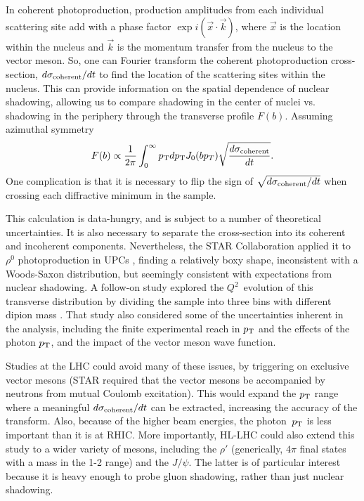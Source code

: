 \documentclass[../report.tex]{subfiles}
\begin{document}

In coherent photoproduction, production amplitudes from each individual scattering site add with a phase factor $\exp{i(\vec{x}\cdot\vec{k})}$, where $\vec{x}$ is the location within the nucleus and $\vec{k}$ is the momentum transfer from the nucleus to the vector meson.  So, one can Fourier transform the coherent photoproduction cross-section, $d\sigma_{\rm coherent}/dt$ to find the location of the scattering sites within the nucleus.  This can provide information on the spatial dependence of nuclear shadowing, allowing us to compare shadowing in the center of nuclei vs. shadowing in the periphery through the transverse profile $F(b)$.   Assuming azimuthal symmetry \cite{Diehl,Toll:2012mb}
\begin{equation}
F(b) \propto \frac{1}{2\pi} \int_0^\infty  p\sb{\scriptstyle\mathrm{T}} dp\sb{\scriptstyle\mathrm{T}} J_0(b p_T) \sqrt{\frac{d\sigma_{\rm coherent}}{dt}}.
\end{equation}
One complication is that it is necessary to flip the sign of $\sqrt{d\sigma_{\rm coherent}/dt}$ when crossing each diffractive minimum in the sample.

This calculation is  data-hungry, and is subject to a number of theoretical uncertainties.  It is also necessary to separate the cross-section into its coherent and incoherent components.  Nevertheless, the STAR Collaboration applied it to $\rho^0$ photoproduction in UPCs \cite{Adamczyk:2017vfu}, finding a relatively boxy shape, inconsistent with a Woods-Saxon distribution, but seemingly consistent with expectations from nuclear shadowing.   A follow-on study explored the  $Q^2$~evolution of this transverse distribution by dividing the sample into three bins with different dipion mass \cite{Klein:2018grn}.  That study also considered some of the uncertainties inherent in the analysis, including the finite experimental reach in $p\sb{\scriptstyle\mathrm{T}}$ and the effects of the photon $p\sb{\scriptstyle\mathrm{T}}$, and the impact of the vector meson wave function. 

Studies at the LHC could avoid many of these issues, by triggering on exclusive vector mesons (STAR required that the vector mesons be accompanied by neutrons from mutual Coulomb excitation).  This would expand the $p\sb{\scriptstyle\mathrm{T}}$ range where a meaningful $d\sigma_{\rm coherent}/dt$ can be extracted, increasing the accuracy of the transform.  Also, because of the higher beam energies, the photon~$p\sb{\scriptstyle\mathrm{T}}$ is less important than it is at RHIC.    More importantly, HL-LHC could also extend this study to a wider variety of mesons, including the $\rho'$ (generically, $4\pi$ final states with a mass in the 1-2 \UGeVcc range) and the $J/\psi$.  The latter is of particular interest because it is heavy enough to probe gluon shadowing, rather than just nuclear shadowing.  
\end{document}
